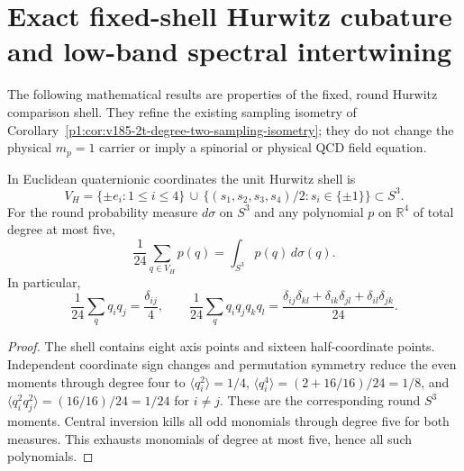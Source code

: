 \documentclass[11pt]{article}
\begin{document}
\clearpage
\section{Exact fixed-shell Hurwitz cubature and low-band spectral intertwining}
\label{p1:sec:v350-hurwitz-exact-spectral}
The following mathematical results are properties of the fixed, round Hurwitz
comparison shell.  They refine the existing sampling isometry of
Corollary~\ref{p1:cor:v185-2t-degree-two-sampling-isometry}; they do not
change the physical $m_p=1$ carrier or imply a spinorial or physical
QCD field equation.

\begin{theorem}
\label{p1:thm:v350-hurwitz-five-design}
In Euclidean quaternionic coordinates the unit Hurwitz shell is
\[
 V_H=\{\pm e_i:1\le i\le4\}\,\cup\,
 \{(s_1,s_2,s_3,s_4)/2:s_i\in\{\pm1\}\}\subset S^3.
\]
For the round probability measure $d\sigma$ on $S^3$ and any polynomial
$p$ on $\mathbb R^4$ of total degree at most five,
\[
 \frac1{24}\sum_{q\in V_H}p(q)=\int_{S^3}p(q)\,d\sigma(q).
\]
In particular,
\[
 \frac1{24}\sum_q q_iq_j=\frac{\delta_{ij}}4,\qquad
 \frac1{24}\sum_q q_iq_jq_kq_l
 =\frac{\delta_{ij}\delta_{kl}+\delta_{ik}\delta_{jl}+
 \delta_{il}\delta_{jk}}{24}.
\]
\end{theorem}
\begin{proof}
The shell contains eight axis points and sixteen half-coordinate points.
Independent coordinate sign changes and permutation symmetry reduce the
even moments through degree four to
$\langle q_i^2\rangle=1/4$,
$\langle q_i^4\rangle=(2+16/16)/24=1/8$, and
$\langle q_i^2q_j^2\rangle=(16/16)/24=1/24$ for $i\ne j$.
These are the corresponding round $S^3$ moments. Central inversion kills
all odd monomials through degree five for both measures. This exhausts
monomials of degree at most five, hence all such polynomials.
\end{proof}
\end{document}
